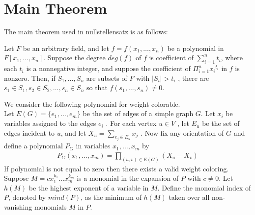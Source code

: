 \section{Main Theorem}
The main theorem used in nullstellensatz is as follows:
\begin{theorem}
	Let $F$ be an arbitrary field, and let $f = f(x_1 ,\ldots, x_n)$ be a polynomial in $F[x_1 ,\ldots, x_n]$. Suppose the degree $deg(f)$ of $f$ is coefficient of $\sum_{i=1}^n t_i$, where each $t_i$ is a nonnegative integer, and suppose the coefficient of $\Pi_{i=1}^n {x_i}^{t_i}$ in $f$ is nonzero. Then, if $S_1 ,\ldots, S_n$ are subsets of $F$ with $|S_i| > t_i$ , there are $s_1 \in S_1 , s_2 \in S_2 ,\ldots, s_n \in S_n$ so that $f(s_1 , \ldots , s_n ) \neq 0$.
	\label{theorem}
\end{theorem}
We consider the following polynomial for weight colorable.
\\
Let $E(G) = \{e_1 , \ldots , e_m\}$ be the set of edges of a simple graph $G$. Let $x_i$ be variables assigned to the edges $e_i$ . For each vertex $u \in V$ , let $E_u$ be the set of edges incident to $u$, and let $X_u = \sum_{e_j \in E_u}x_j$ . Now fix any orientation of $G$ and define a polynomial $P_G$ in variables $x_1 , \ldots , x_m$ by
\begin{align*}
	P_G(x_1,\ldots,x_m) = \prod_{(u,v) \in E(G)} (X_u - X_v)
\end{align*}
If polynomial is not equal to zero then there exists a valid weight coloring.
\\
Suppose $M = cx_1^{k_1} \ldots x_m^{k_m}$ is a monomial in the expansion of $P$ with $c \neq 0$. Let $h(M)$ be the highest exponent of a variable in $M$. Define the monomial index of $P$, denoted by $mind(P)$, as the minimum of $h(M)$ taken over all non-vanishing monomials $M$ in $P$.